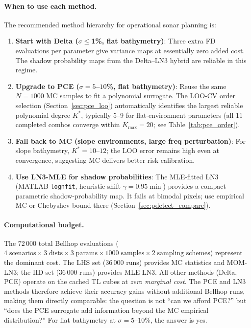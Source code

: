 \documentclass[11pt,a4paper]{article}
\begin{document}
\paragraph{When to use each method.}
The recommended method hierarchy for operational sonar planning is:
\begin{enumerate}
  \item \textbf{Start with Delta ($\sigma\leq$1\%, flat bathymetry)}: Three extra FD
        evaluations per parameter give variance maps at essentially zero added cost.
        The shadow probability maps from the Delta--LN3 hybrid are reliable in this regime.
  \item \textbf{Upgrade to PCE ($\sigma=5$--$10$\%, flat bathymetry)}: Reuse the same
        $N=1000$ MC samples to fit a polynomial surrogate.  The LOO-CV order selection
        (Section~\ref{sec:pce_loo}) automatically identifies the largest reliable polynomial
        degree $K^*$, typically 5--9 for flat-environment parameters (all 11 completed
        combos converge within $K_{\max}=20$; see Table~\ref{tab:pce_order}).
  \item \textbf{Fall back to MC (slope environments, large freq perturbation)}: For
        slope bathymetry, $K^*=10$--$12$; the LOO error remains high even at convergence,
        suggesting MC delivers better risk calibration.
  \item \textbf{Use LN3-MLE for shadow probabilities}: The MLE-fitted LN3 (MATLAB
        \texttt{lognfit}, heuristic shift $\gamma=0.95\min$) provides a compact
        parametric shadow-probability map.  It fails at bimodal pixels; use empirical
        MC or Chebyshev bound there (Section~\ref{sec:pdetect_compare}).
\end{enumerate}

\paragraph{Computational budget.}
The $72\,000$ total Bellhop evaluations
($4\;\text{scenarios}\times3\;\text{dists}\times3\;\text{params}\times1000\;\text{samples}\times2\;\text{sampling schemes}$)
represent the dominant cost.
The LHS set ($36\,000$ runs) provides MC statistics and MOM-LN3;
the IID set ($36\,000$ runs) provides MLE-LN3.
All other methods (Delta, PCE) operate on the cached TL cubes at \emph{zero marginal cost}.
The PCE and LN3 methods therefore achieve their accuracy gains without additional Bellhop runs,
making them directly comparable: the question is not ``can we afford PCE?'' but
``does the PCE surrogate add information beyond the MC empirical distribution?''
For flat bathymetry at $\sigma=5$--$10$\%, the answer is yes.
\end{document}

